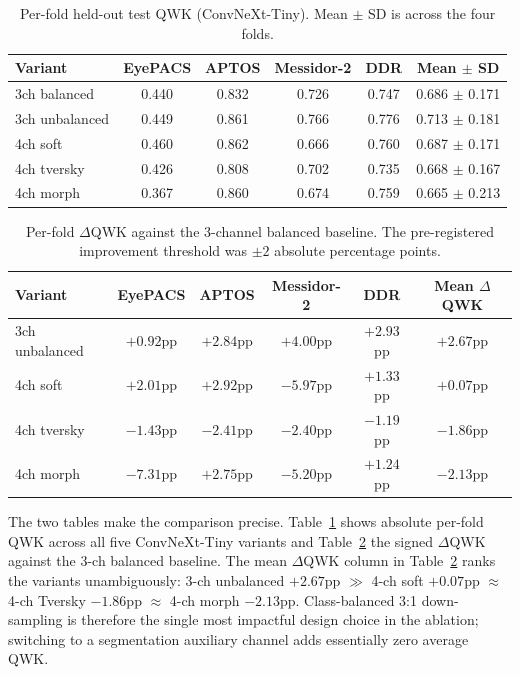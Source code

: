 \documentclass[11pt]{article}
\begin{document}
\begin{table}[ht]
\centering
\small
\begin{tabular}{lccccc}
\toprule
Variant & EyePACS & APTOS & Messidor-2 & DDR & Mean $\pm$ SD \\
\midrule
3ch balanced   & 0.440 & 0.832 & 0.726 & 0.747 & 0.686 $\pm$ 0.171 \\
3ch unbalanced & 0.449 & 0.861 & 0.766 & 0.776 & 0.713 $\pm$ 0.181 \\
4ch soft       & 0.460 & 0.862 & 0.666 & 0.760 & 0.687 $\pm$ 0.171 \\
4ch tversky    & 0.426 & 0.808 & 0.702 & 0.735 & 0.668 $\pm$ 0.167 \\
4ch morph      & 0.367 & 0.860 & 0.674 & 0.759 & 0.665 $\pm$ 0.213 \\
\bottomrule
\end{tabular}
\caption{Per-fold held-out test QWK (ConvNeXt-Tiny). Mean $\pm$ SD is across the four folds.}
\label{tab:qwk-per-variant}
\end{table}

\begin{table}[ht]
\centering
\small
\begin{tabular}{lccccc}
\toprule
Variant & EyePACS & APTOS & Messidor-2 & DDR & Mean $\Delta$QWK \\
\midrule
3ch unbalanced & $+0.92$pp & $+2.84$pp & $+4.00$pp & $+2.93$pp & $+2.67$pp \\
4ch soft       & $+2.01$pp & $+2.92$pp & $-5.97$pp & $+1.33$pp & $+0.07$pp \\
4ch tversky    & $-1.43$pp & $-2.41$pp & $-2.40$pp & $-1.19$pp & $-1.86$pp \\
4ch morph      & $-7.31$pp & $+2.75$pp & $-5.20$pp & $+1.24$pp & $-2.13$pp \\
\bottomrule
\end{tabular}
\caption{Per-fold $\Delta$QWK against the 3-channel balanced baseline. The pre-registered improvement threshold was $\pm 2$ absolute percentage points.}
\label{tab:delta-qwk}
\end{table}

The two tables make the comparison precise. Table~\ref{tab:qwk-per-variant} shows absolute per-fold QWK across all five ConvNeXt-Tiny variants and Table~\ref{tab:delta-qwk} the signed $\Delta$QWK against the 3-ch balanced baseline. The mean $\Delta$QWK column in Table~\ref{tab:delta-qwk} ranks the variants unambiguously: 3-ch unbalanced $+2.67$pp $\gg$ 4-ch soft $+0.07$pp $\approx$ 4-ch Tversky $-1.86$pp $\approx$ 4-ch morph $-2.13$pp. Class-balanced 3:1 down-sampling is therefore the single most impactful design choice in the ablation; switching to a segmentation auxiliary channel adds essentially zero average QWK.
\end{document}
